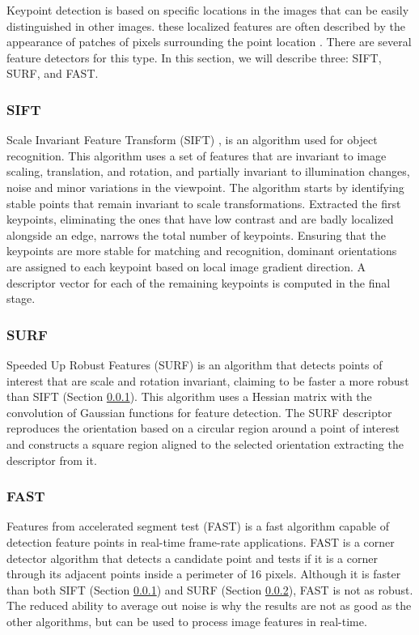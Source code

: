 Keypoint detection is based on specific locations in the images that can be easily distinguished in other images.  these localized features are often described by the appearance of patches of pixels surrounding the point location \cite{szeliski2011computer}.
There are several feature detectors for this type. In this section, we will describe three: SIFT\cite{lowe1999object}, SURF\cite{bay2006surf}, and FAST\cite{rosten2006machine}.

\subsubsection{SIFT}
\label{subsub:sift}
Scale Invariant Feature Transform (SIFT) \cite{lowe1999object}, is an algorithm used for object recognition. This algorithm uses a set of features that are invariant to image scaling, translation, and rotation, and partially invariant to illumination changes, noise and minor variations in the viewpoint.
The algorithm starts by identifying stable points that remain invariant to scale transformations. Extracted the first keypoints, eliminating the ones that have low contrast and are badly localized alongside an edge, narrows the total number of keypoints. Ensuring that the keypoints are more stable for matching and recognition, dominant orientations are assigned to each keypoint based on local image gradient direction. A descriptor vector for each of the remaining keypoints is computed in the final stage.

\subsubsection{SURF}
\label{subsub:surf}

Speeded Up Robust Features (SURF) \cite{bay2006surf} is an algorithm that detects points of interest that are scale and rotation invariant, claiming to be faster a more robust than SIFT (Section \ref{subsub:sift}). This algorithm uses a Hessian matrix with the convolution of Gaussian functions for feature detection. The SURF descriptor reproduces the orientation based on a circular region around a point of interest and constructs a square region aligned to the selected orientation extracting the descriptor from it.

\subsubsection{FAST}
\label{subsub:fast}

Features from accelerated segment test (FAST) \cite{rosten2006machine} is a fast algorithm capable of detection feature points in real-time frame-rate applications. FAST is a corner detector algorithm that detects a candidate point and tests if it is a corner through its adjacent points inside a perimeter of 16 pixels. Although it is faster than both SIFT (Section \ref{subsub:sift}) and SURF (Section \ref{subsub:surf}), FAST is not as robust. The reduced ability to average out noise is why the results are not as good as the other algorithms, but can be used to process image features in real-time.

